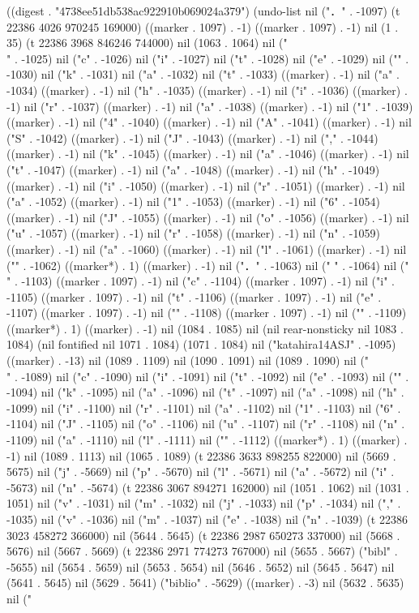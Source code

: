 
((digest . "4738ee51db538ac922910b069024a379") (undo-list nil ("．" . -1097) (t 22386 4026 970245 169000) ((marker . 1097) . -1) ((marker . 1097) . -1) nil (1 . 35) (t 22386 3968 846246 744000) nil (1063 . 1064) nil ("\\" . -1025) nil ("c" . -1026) nil ("i" . -1027) nil ("t" . -1028) nil ("e" . -1029) nil ("{" . -1030) nil ("k" . -1031) nil ("a" . -1032) nil ("t" . -1033) ((marker) . -1) nil ("a" . -1034) ((marker) . -1) nil ("h" . -1035) ((marker) . -1) nil ("i" . -1036) ((marker) . -1) nil ("r" . -1037) ((marker) . -1) nil ("a" . -1038) ((marker) . -1) nil ("1" . -1039) ((marker) . -1) nil ("4" . -1040) ((marker) . -1) nil ("A" . -1041) ((marker) . -1) nil ("S" . -1042) ((marker) . -1) nil ("J" . -1043) ((marker) . -1) nil ("," . -1044) ((marker) . -1) nil ("k" . -1045) ((marker) . -1) nil ("a" . -1046) ((marker) . -1) nil ("t" . -1047) ((marker) . -1) nil ("a" . -1048) ((marker) . -1) nil ("h" . -1049) ((marker) . -1) nil ("i" . -1050) ((marker) . -1) nil ("r" . -1051) ((marker) . -1) nil ("a" . -1052) ((marker) . -1) nil ("1" . -1053) ((marker) . -1) nil ("6" . -1054) ((marker) . -1) nil ("J" . -1055) ((marker) . -1) nil ("o" . -1056) ((marker) . -1) nil ("u" . -1057) ((marker) . -1) nil ("r" . -1058) ((marker) . -1) nil ("n" . -1059) ((marker) . -1) nil ("a" . -1060) ((marker) . -1) nil ("l" . -1061) ((marker) . -1) nil ("}" . -1062) ((marker*) . 1) ((marker) . -1) nil ("．" . -1063) nil ("
" . -1064) nil ("\\" . -1103) ((marker . 1097) . -1) nil ("c" . -1104) ((marker . 1097) . -1) nil ("i" . -1105) ((marker . 1097) . -1) nil ("t" . -1106) ((marker . 1097) . -1) nil ("e" . -1107) ((marker . 1097) . -1) nil ("{" . -1108) ((marker . 1097) . -1) nil ("}" . -1109) ((marker*) . 1) ((marker) . -1) nil (1084 . 1085) nil (nil rear-nonsticky nil 1083 . 1084) (nil fontified nil 1071 . 1084) (1071 . 1084) nil ("katahira14ASJ" . -1095) ((marker) . -13) nil (1089 . 1109) nil (1090 . 1091) nil (1089 . 1090) nil ("\\" . -1089) nil ("c" . -1090) nil ("i" . -1091) nil ("t" . -1092) nil ("e" . -1093) nil ("{" . -1094) nil ("k" . -1095) nil ("a" . -1096) nil ("t" . -1097) nil ("a" . -1098) nil ("h" . -1099) nil ("i" . -1100) nil ("r" . -1101) nil ("a" . -1102) nil ("1" . -1103) nil ("6" . -1104) nil ("J" . -1105) nil ("o" . -1106) nil ("u" . -1107) nil ("r" . -1108) nil ("n" . -1109) nil ("a" . -1110) nil ("l" . -1111) nil ("}" . -1112) ((marker*) . 1) ((marker) . -1) nil (1089 . 1113) nil (1065 . 1089) (t 22386 3633 898255 822000) nil (5669 . 5675) nil ("j" . -5669) nil ("p" . -5670) nil ("l" . -5671) nil ("a" . -5672) nil ("i" . -5673) nil ("n" . -5674) (t 22386 3067 894271 162000) nil (1051 . 1062) nil (1031 . 1051) nil ("v" . -1031) nil ("m" . -1032) nil ("j" . -1033) nil ("p" . -1034) nil ("," . -1035) nil ("v" . -1036) nil ("m" . -1037) nil ("e" . -1038) nil ("n" . -1039) (t 22386 3023 458272 366000) nil (5644 . 5645) (t 22386 2987 650273 337000) nil (5668 . 5676) nil (5667 . 5669) (t 22386 2971 774273 767000) nil (5655 . 5667) ("bibl" . -5655) nil (5654 . 5659) nil (5653 . 5654) nil (5646 . 5652) nil (5645 . 5647) nil (5641 . 5645) nil (5629 . 5641) ("biblio" . -5629) ((marker) . -3) nil (5632 . 5635) nil ("

